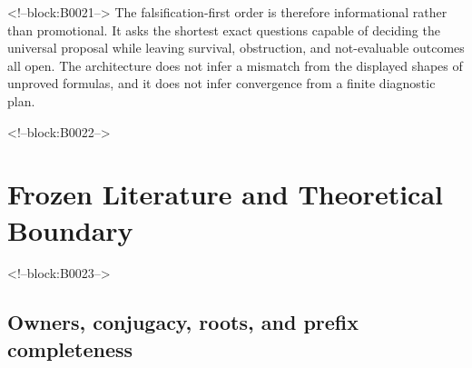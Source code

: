 \documentclass[11pt]{article}
\begin{document}
<!--block:B0021-->
The falsification-first order is therefore informational rather than
promotional. It asks the shortest exact questions capable of deciding
the universal proposal while leaving survival, obstruction, and
not-evaluable outcomes all open. The architecture does not infer a
mismatch from the displayed shapes of unproved formulas, and it does not
infer convergence from a finite diagnostic plan.

<!--block:B0022-->
\hypertarget{2-frozen-literature-and-theoretical-boundary}{%
\section{Frozen Literature and Theoretical
Boundary}\label{2-frozen-literature-and-theoretical-boundary}}

<!--block:B0023-->
\hypertarget{21-owners-conjugacy-roots-and-prefix-completeness}{%
\subsection{Owners, conjugacy, roots, and prefix
completeness}\label{21-owners-conjugacy-roots-and-prefix-completeness}}
\end{document}
